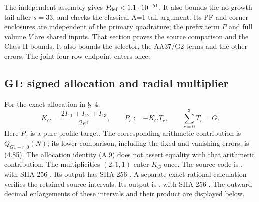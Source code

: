 {The independent assembly gives $P_{\rm def}<1.1\cdot10^{-51}$.
It also bounds the
no-growth tail after $s=33$, and checks the classical A=1 tail argument.
Its PF and corner enclosures are independent of the primary quadrature;
the prefix term $P$ and full volume $V$ are shared inputs.
That section proves the source comparison and the Class-II bounds.
It also bounds the selector, the AA37/G2 terms and the other errors.
The joint four-row endpoint enters once.

\subsection{G1: signed allocation and radial multiplier}

For the exact allocation in \S~4,
\[
 K_G=\frac{2I_{11}+I_{12}+I_{13}}{2e^\gamma},\qquad
 P_r:=-K_GT_r,\qquad \sum_{r=0}^3T_r=\overline G.
                                                               \tag{A.9}
\]
Here $P_r$ is a pure profile target. The corresponding arithmetic
contribution is $Q_{G1-r,0}(N)$; its lower comparison, including the
fixed and vanishing errors, is (4.85). The allocation identity (A.9)
does not assert equality with that arithmetic contribution.
The multiplicities $(2,1,1)$ enter $K_G$ once. The source code is
,
with SHA-256 .
Its output 
has SHA-256
.
A separate exact rational calculation verifies the retained source intervals.
Its output is
, with SHA-256
.
The outward decimal enlargements of these intervals and their product are displayed below.

}
